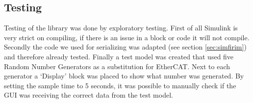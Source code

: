 \subsection{Testing}
Testing of the library was done by exploratory testing. First of all Simulink is very strict on compiling, if there is an issue in a block or code it will not compile. Secondly the code we used for serializing was adapted (see section \ref{sec:simfirim})  and therefore already tested. Finally a test model was created that used five Random Number Generators as a substitution for EtherCAT. Next to each generator a `Display' block was placed to show what number was generated. By setting the sample time to 5 seconds, it was possible to manually check if the GUI was receiving the correct data from the test model.